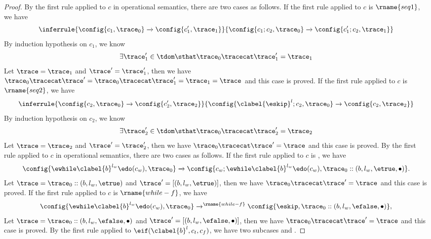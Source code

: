 \begin{proof}
  By the first rule applied to $c$ in operational semantics, there are two cases as follows.
  If the first rule applied to $c$ is $\rname{seq1}$, we have
  \[
    \inferrule
    {
    \config{{c_1, \trace_0}}
    \xrightarrow{}
    \config{{c_1',  \trace_1}}
    }
    {
    \config{{c_1; c_2, \trace_0}} 
    \xrightarrow{} 
    \config{{c_1'; c_2, \trace_1}}
    }
  \]
  By induction hypothesis on $c_1$, we know 
  \[
    \exists \trace_1' \in \tdom \sthat \trace_0 \tracecat \trace_1' = \trace_1
  \]
  Let $\trace = \trace_1$ and $\trace' =  \trace_1'$,
  then we have $\trace_0 \tracecat \trace' = \trace_0 \tracecat \trace_1' = \trace_1 = \trace$ and this case is proved.
  If the first rule applied to $c$ is $\rname{seq2}$, we have
  \[
    \inferrule
    {
    \config{{c_2, \trace_0}}
    \xrightarrow{}
    \config{{c_2',  \trace_2}}
    }
    {
    \config{{\clabel{\eskip}^l; c_2, \trace_0}} 
    \xrightarrow{} 
    \config{{c_2, \trace_2}}
    }
  \]
  By induction hypothesis on $c_2$, we know 
  \[
    \exists \trace_2' \in \tdom \sthat \trace_0 \tracecat \trace_2' = \trace_2
  \]
  Let $\trace = \trace_2$ and $\trace' =  \trace_2'$,
  then we have $\trace_0 \tracecat \trace' = \trace$ and this case is proved.
  By the first rule applied to $c$ in operational semantics, there are two cases as follows.
  If the first rule applied to $c$ is , we have
  \[
    \config{{\ewhile \clabel{b}^{l_w} \edo (c_w), \trace_0}}
    \xrightarrow{} 
    \config{{
    c_w; \ewhile \clabel{b}^{l_w} \edo (c_w),
    \trace_0 :: (b, l_w, \etrue, \bullet)}}.
  \]
  Let $\trace = \trace_0 ::(b, l_w, \etrue)$ and $\trace' =  [(b, l_w, \etrue)]$,
  then we have $\trace_0 \tracecat \trace' = \trace$ and this case is proved.
  If the first rule applied to $c$ is $\rname{while-f}$, we have
  \[
    \config{{\ewhile \clabel{b}^{l_w} \edo (c_w), \trace_0}}
    \xrightarrow{}^\rname{while-f}
    \config{{
    \eskip,
    \trace_0 :: (b, l_w, \efalse, \bullet)}},
  \]
  Let $\trace = \trace_0 ::(b, l_w, \efalse, \bullet)$ 
  and $\trace' =  [(b, l_w, \efalse, \bullet)]$,
  then we have $\trace_0 \tracecat \trace' = \trace$ and this case is proved.
  By the first rule applied to $\eif(\clabel{b}^l, c_t, c_f)$,
  we have two subcases  and .
  

\end{proof}
